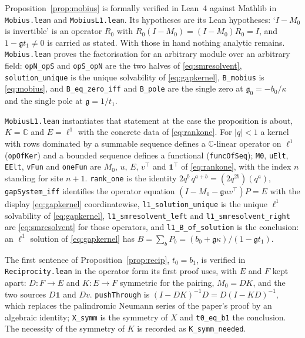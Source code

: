 \documentclass[11pt]{article}
\theoremstyle{plain}
\theoremstyle{definition}
\theoremstyle{remark}
\newcommand{\C}{\mathbb{C}}
\begin{document}
Proposition~\ref{prop:mobius} is formally verified in Lean~4 against Mathlib
\cite{MathlibCommunity} in \texttt{Mobius.lean} and \texttt{MobiusL1.lean}. Its hypotheses are its
Lean hypotheses: `$I-M_0$ is invertible' is an operator $R_0$ with $R_0(I-M_0)=(I-M_0)R_0=I$, and
$1-\mathfrak gt_1\ne0$ is carried as stated. With those in hand nothing analytic remains.
\texttt{Mobius.lean} proves the factorisation for an arbitrary module over an arbitrary field:
\texttt{opN\_opS} and \texttt{opS\_opN} are the two halves of \eqref{eq:smresolvent},
\texttt{solution\_unique} is the unique solvability of \eqref{eq:gapkernel},
\texttt{B\_mobius} is \eqref{eq:mobius}, and \texttt{B\_eq\_zero\_iff} and \texttt{B\_pole} are the
single zero at $\mathfrak g_0=-b_0/\kappa$ and the single pole at $\mathfrak g=1/t_1$.

\texttt{MobiusL1.lean} instantiates that statement at the case the proposition is about, $K=\C$
and $E=\ell^1$ with the concrete data of \eqref{eq:rankone}. For $|q|<1$ a kernel with rows
dominated by a summable sequence defines a $\C$-linear operator on $\ell^1$ (\texttt{opOfKer}) and
a bounded sequence defines a functional (\texttt{funcOfSeq}); \texttt{M0}, \texttt{uElt},
\texttt{EElt}, \texttt{vFun} and \texttt{oneFun} are $M_0$, $u$, $E$, $v^{\!\top}$ and
$\mathbf 1^{\!\top}$ of \eqref{eq:rankone}, with the index $n$ standing for site $n+1$.
\texttt{rank\_one} is the identity $2q^b\,q^{a+b}=(2q^{2b})(q^a)$, \texttt{gapSystem\_iff}
identifies the operator equation $(I-M_0-\mathfrak guv^{\!\top})P=E$ with the display
\eqref{eq:gapkernel} coordinatewise, \texttt{l1\_solution\_unique} is the unique $\ell^1$
solvability of \eqref{eq:gapkernel}, \texttt{l1\_smresolvent\_left} and
\texttt{l1\_smresolvent\_right} are \eqref{eq:smresolvent} for those operators, and
\texttt{l1\_B\_of\_solution} is the conclusion: an $\ell^1$ solution of \eqref{eq:gapkernel} has
$B=\sum_bP_b=(b_0+\mathfrak g\kappa)/(1-\mathfrak gt_1)$.

The first sentence of Proposition~\ref{prop:recip}, $t_0=b_1$, is verified in
\texttt{Reciprocity.lean} in the operator form its first proof uses, with $E$ and $F$ kept apart:
$D\colon F\to E$ and $K\colon E\to F$ symmetric for the pairing, $M_0=DK$, and the two sources
$D\mathbf 1$ and $Dv$. \texttt{pushThrough} is $(I-DK)^{-1}D=D(I-KD)^{-1}$, which replaces the
palindromic Neumann series of the paper's proof by an algebraic identity;
\texttt{X\_symm} is the symmetry of $X$ and \texttt{t0\_eq\_b1} the conclusion. The
necessity of the symmetry of $K$ is recorded as \texttt{K\_symm\_needed}.
\end{document}
